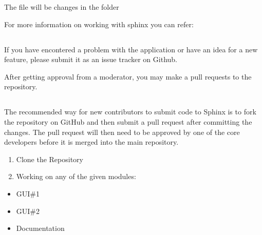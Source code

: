 \documentclass[letterpaper,10pt,english]{sphinxmanual}
\begin{document}
\begin{sphinxVerbatim}[commandchars=\\\{\}]
 
 
\end{sphinxVerbatim}

The file will be changes in the  folder

For more information on working with sphinx you can refer:


\subsection{}
\label{\detokenize{developer:bug-reports-and-feature-requests}}
If you have encontered a problem with the application or have an idea for a new feature, please submit it as an issue tracker on Github.

After getting approval from a moderator, you may make a pull requests to the repository.


\subsection{}
\label{\detokenize{developer:contributing-on-the-project}}
The recommended way for new contributors to submit code to Sphinx is to fork the repository on GitHub and then submit a pull request after committing the changes. The pull request will then need to be approved by one of the core developers before it is merged into the main repository.
\begin{enumerate}
%
\item {} 
Clone the Repository

\item {} 
Working on any of the given modules:

\end{enumerate}
\begin{itemize}
\item {} 
GUI\#1

\item {} 
GUI\#2

\item {} 
Documentation

\end{itemize}
\end{document}
